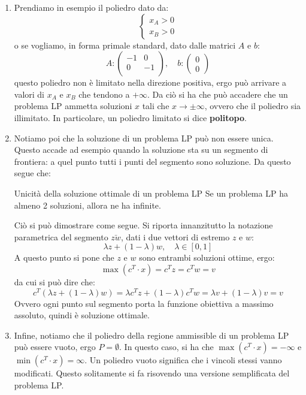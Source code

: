 \documentclass[a4paper,11pt]{article}
\begin{document}
\begin{enumerate}
	\item 
		Prendiamo in esempio il poliedro dato da:
		\[
			\begin{cases}
				x_A > 0 \\ 
				x_B > 0
			\end{cases}
		\]
		o se vogliamo, in forma primale standard, dato dalle matrici $A$ e $b$:
		$$
		A:
		\begin{pmatrix}
			-1 & 0 \\	
			0 & -1 \\	
		\end{pmatrix}
		, \quad b:
		\begin{pmatrix}
			0 \\ 
			0
		\end{pmatrix}
		$$
		questo poliedro non è limitato nella direzione positiva, ergo può arrivare a valori di $x_A$ e $x_B$ che tendono a $+\infty$.
		Da ciò si ha che può accadere che un problema LP ammetta soluzioni $x$ tali che $x \rightarrow \pm \infty $,
		ovvero che il poliedro sia illimitato.
		In particolare, un poliedro limitato si dice \textbf{politopo}.
	\item Notiamo poi che la soluzione di un problema LP può non essere unica.
		Questo accade ad esempio quando la soluzione sta su un segmento di frontiera: a quel punto tutti i punti del segmento sono soluzione.
		Da questo segue che:
		\begin{theorem}{Unicità della soluzione ottimale di un problema LP}
			Se un problema LP ha almeno 2 soluzioni, allora ne ha infinite.
		\end{theorem}
		Ciò si può dimostrare come segue.
		Si riporta innanzitutto la notazione parametrica del segmento $\bar{zw}$, dati i due vettori di estremo $z$ e $w$:
		$$
			\lambda z + (1 - \lambda)w, \quad \lambda \in [ 0, 1 ]
		$$
		A questo punto si pone che $z$ e $w$ sono entrambi soluzioni ottime, ergo: 
		$$ 
			\max(c^T \cdot x) = c^T z = c^T w = v 
		$$
		da cui si può dire che:
		$$ 
			c^T\left(\lambda z + (1 - \lambda)w\right) = \lambda c^T z + (1 - \lambda) c^T w = \lambda v + (1 - \lambda) v = v 
		$$
		Ovvero ogni punto sul segmento porta la funzione obiettiva a massimo assoluto, quindi è soluzione ottimale.
	\item Infine, notiamo che il poliedro della regione ammissible di un problema LP può essere vuoto, ergo $P = \emptyset$.
		In questo caso, si ha che $ \max(c^T \cdot x) = -\infty $ e $ \min(c^T \cdot x) = \infty $. 
		Un poliedro vuoto significa che i vincoli stessi vanno modificati. 
		Questo solitamente si fa risovendo una versione semplificata del problema LP.
\end{enumerate}
\end{document}
